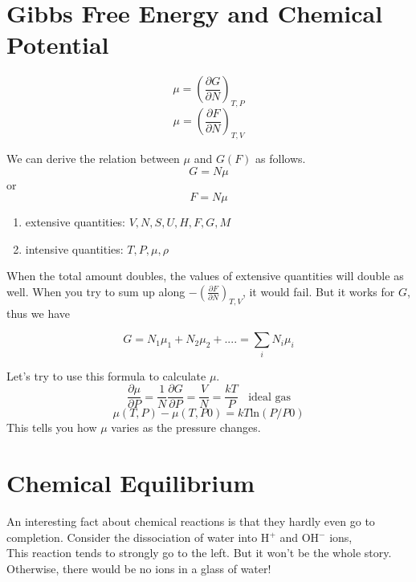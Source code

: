 

\section{Gibbs Free Energy and Chemical Potential}

\begin{equation}\mu  = (\frac{\partial {G}}{\partial {N}})_{T,P} \end{equation}
\begin{equation}\mu  = (\frac{\partial {F}}{\partial {N}})_{T,V} \end{equation}

We can derive the relation between $\mu$ and $G(F)$ as follows.
\begin{equation} G = N\mu \end{equation}
or 
\begin{equation} F = N\mu \end{equation}

\begin{enumerate}
\item extensive quantities: $V, N, S, U, H, F, G, M$
\item intensive quantities: $T, P, \mu, \rho$
\end{enumerate}

When the total amount doubles, the values of extensive quantities will double as well. 
When you try to sum up along $-(\frac{\partial {F}}{\partial {N}})_{T,V}$, it would fail.
But it works for $G$, thus we have 

\begin{equation}G  = N_1\mu_1 + N_2\mu_2 + .... = \sum_i N_i\mu_i \end{equation}

Let's try to use this formula to calculate $\mu$. 
\begin{equation}\frac{\partial \mu}{\partial P} = \frac{1}{N} \frac{\partial G} {\partial P} = \frac{V}{N} = \frac{kT}{P} ~~~~\text{ideal gas}\end{equation}
\begin{equation} \mu(T,P) - \mu(T,P0) = kT \text{ln}(P/P0) \end{equation}
This tells you how $\mu$ varies as the pressure changes.

\section{Chemical Equilibrium}
An interesting fact about chemical reactions is that they hardly even go to completion. Consider the dissociation of water into
H$^+$ and OH$^-$ ions,
 \\
This reaction tends to strongly go to the left. But it won't be the whole story. Otherwise, there would be no ions in a glass of water!

